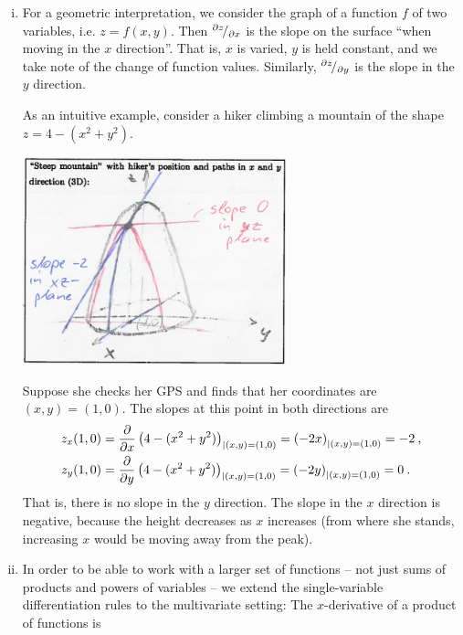 \begin{remark}
\begin{enumerate}[(i)]	
\item For a geometric interpretation, we consider the graph of a function $f$ of two variables, i.e. $z = f(x,y)$. Then ${}^{\partial z}\!/_{\partial x}$ is the slope on the surface ``when moving in the $x$ direction''. That is, $x$ is varied, $y$ is held constant, and we take note of the change of function values. Similarly, ${}^{\partial z}\!/_{\partial y}$ is the slope in the $y$ direction. 

As an intuitive example, consider a hiker climbing a mountain of the shape $z = 4-(x^2+y^2)$. 
\begin{center}
	\includegraphics[width=0.6\textwidth]{./Figures/f304.png}
\end{center}
Suppose she checks her GPS and finds that her coordinates are $(x,y) = (1,0)$. The slopes at this point in both directions are
\begin{equation*}
\begin{split}
z_x(1,0) & = \displaystyle{\frac{\partial }{\partial x}} \left( 4-(x^2+y^2) \right)_{|(x,y)=(1,0)} 
	= \left( -2x \right)_{|(x,y)=(1,0)} = -2 \:, \\
z_y(1,0) & = \displaystyle{\frac{\partial }{\partial y}} \left( 4-(x^2+y^2) \right)_{|(x,y)=(1,0)} 
	= \left( -2y \right)_{|(x,y)=(1,0)} = 0 \:.
\end{split}
\end{equation*}
That is, there is no slope in the $y$ direction. The slope in the $x$ direction is negative, because the height decreases as $x$ increases (from where she stands, increasing $x$ would be moving away from the peak).
\item In order to be able to work with a larger set of functions -- not just sums of  products and powers of variables -- we extend the single-variable differentiation rules to the multivariate setting: The $x$-derivative of a product of functions is

\end{enumerate}
\end{remark}
